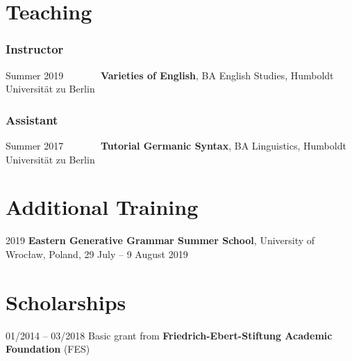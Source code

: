 \documentclass[11pt]{article}
\begin{document}
\section*{Teaching}
\vspace{-1em}
\subsubsection*{Instructor}
\begin{list}{}{
		\setlength{\leftmargin}{3.5cm}
		\setlength{\itemindent}{-2.5cm}
	}
	
	\item[Summer 2019~~~~~~~] \textbf{Varieties of English}, BA English Studies, Humboldt Universität zu Berlin
\end{list}
\vspace{-1em}
\subsubsection*{Assistant}	
\begin{list}{}{
		\setlength{\leftmargin}{3.5cm}
		\setlength{\itemindent}{-2.5cm}
	}
	
	\item[Summer 2017~~~~~~~] \textbf{Tutorial Germanic Syntax}, BA Linguistics, Humboldt Universität zu Berlin
\end{list}


\section*{Additional Training}
\begin{list}{}{
		\setlength{\leftmargin}{3.5cm}
		\setlength{\itemindent}{-2.5cm}
	}
	
	\item[2019\phantom{~--~03/2022/04~}] \textbf{Eastern Generative Grammar Summer School}, University of Wrocław, Poland, 29 July -- 9 August 2019
\end{list}


\section*{Scholarships}

\begin{list}{}{
	\setlength{\leftmargin}{3.5cm}
	\setlength{\itemindent}{-2.5cm}
	}

	\item[01/2014 -- 03/2018] Basic grant from \textbf{Friedrich-Ebert-Stiftung Academic Foundation} (FES)

\end{list}
\end{document}
